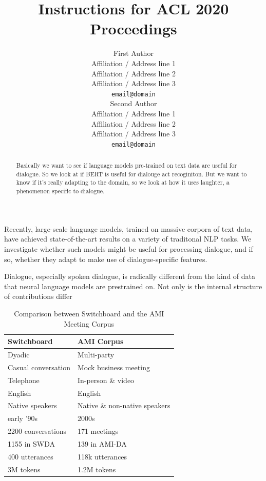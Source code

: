 \documentclass[11pt,a4paper]{article}
\title{Instructions for ACL 2020 Proceedings}
\author{First Author \\
  Affiliation / Address line 1 \\
  Affiliation / Address line 2 \\
  Affiliation / Address line 3 \\
  \texttt{email@domain} \\\And
  Second Author \\
  Affiliation / Address line 1 \\
  Affiliation / Address line 2 \\
  Affiliation / Address line 3 \\
  \texttt{email@domain} \\}
\date{}
\begin{document}
\maketitle
\begin{abstract}
  Basically we want to see if language models pre-trained on text data are useful for dialogue.
  So we look at if BERT is useful for dialouge act recoginiton.
  But we want to know if it's really adapting to the domain, so we look at how it uses laughter, a phenomenon specific to dialogue.
\end{abstract}


Recently, large-scale language models, trained on massive corpora of text data, have achieved state-of-the-art results on a variety of traditonal NLP tasks.
We investigate whether such models might be useful for processing dialogue, and if so, whether they adapt to make use of dialogue-specific features.

Dialogue, especially spoken dialogue, is radically different from the kind of data that neural language models are prestrained on.
Not only is the internal structure of contributions differ%

\begin{table}[]
\centering
\begin{tabular}{@{}ll@{}}
\toprule
\textbf{Switchboard}       & \textbf{AMI Corpus}                     \\ \midrule
Dyadic                     & Multi-party                             \\
Casual conversation        & Mock business meeting                   \\
Telephone                  & In-person \& video                      \\ \midrule
English                    & English                                 \\ 
Native speakers            & Native \& non-native speakers           \\ 
early '90s                 & 2000s                                   \\ \midrule
2200 conversations         & 171 meetings                            \\
  \hspace{1em} 1155 in SWDA               & \hspace{1em} 139 in AMI-DA                           \\
400 utterances             & 118k utterances                         \\
3M tokens                  & 1.2M tokens                             \\ \bottomrule
\end{tabular}
  \caption{Comparison between Switchboard and the AMI Meeting Corpus}
  \label{table:corpora}
\end{table}
\end{document}

